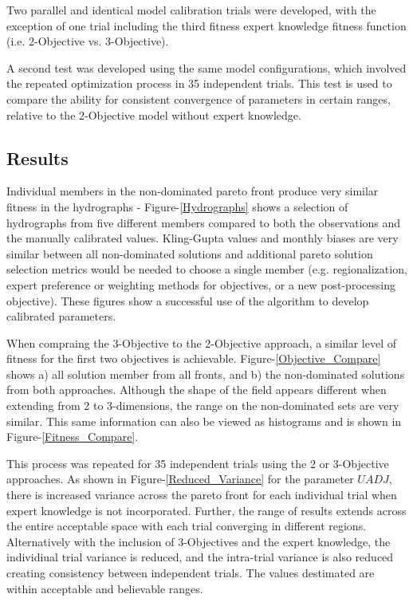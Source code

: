 \documentclass[11pt]{article} %
\begin{document}
Two parallel and identical model calibration trials were developed, with the exception of one trial including the third fitness expert knowledge fitness function (i.e. 2-Objective vs. 3-Objective). 

A second test was developed using the same model configurations, which involved the repeated optimization process in 35 independent trials. This test is used to compare the ability for consistent convergence of parameters in certain ranges, relative to the 2-Objective model without expert knowledge.

\subsection{Results}
Individual members in the non-dominated pareto front produce very similar fitness in the hydrographs - Figure-\ref{Hydrographs} shows a selection of hydrographs from five different members compared to both the observations and the manually calibrated values. Kling-Gupta values and monthly biases are very similar between all non-dominated solutions and additional pareto solution selection metrics would be needed to choose a single member (e.g. regionalization, expert preference or weighting methods for objectives, or a new post-processing objective). These figures show a successful use of the algorithm to develop calibrated parameters.

When compraing the 3-Objective to the 2-Objective approach, a similar level of fitness for the first two objectives is achievable. Figure-\ref{Objective_Compare} shows a) all solution member from all fronts, and b) the non-dominated solutions from both approaches. Although the shape of the field appears different when extending from 2 to 3-dimensions, the range on the non-dominated sets are very similar. This same information can also be viewed as histograms and is shown in Figure-\ref{Fitness_Compare}.

This process was repeated for 35 independent trials using the 2 or 3-Objective approaches. As shown in Figure-\ref{Reduced_Variance} for the parameter $UADJ$, there is increased variance across the pareto front for each individual trial when expert knowledge is not incorporated. Further, the range of results extends across the entire acceptable space with each trial converging in different regions. Alternatively with the inclusion of 3-Objectives and the expert knowledge, the individiual trial variance is reduced, and the intra-trial variance is also reduced creating consistency between independent trials. The values destimated are within acceptable and believable ranges.
\end{document}
